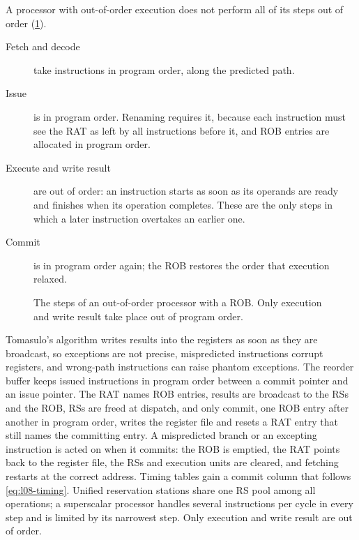 \documentclass[../main.tex]{subfiles}
\begin{document}
A processor with out-of-order execution does not
perform all of its steps out of order (\cref{fig:l08-order}).
\begin{description}
  \item[Fetch and decode] take instructions in program order, along the
    predicted path.
  \item[Issue] is in program order.  Renaming requires it, because each
    instruction must see the RAT as left by all instructions before it, and
    ROB entries are allocated in program order.
  \item[Execute and write result] are out of order: an instruction starts as
    soon as its operands are ready and finishes when its operation completes.
    These are the only steps in which a later instruction overtakes an
    earlier one.
  \item[Commit] is in program order again; the ROB restores the order that
    execution relaxed.
\end{description}

\begin{figure}[htbp]
  \centering
  
  \caption{The steps of an out-of-order processor with a ROB.  Only execution
    and write result take place out of program order.}
  \label{fig:l08-order}
\end{figure}

\begin{keypoint}
  Tomasulo's algorithm writes results into the registers as soon as they are
  broadcast, so exceptions are not precise, mispredicted instructions corrupt
  registers, and wrong-path instructions can raise phantom exceptions.  The
  reorder buffer keeps issued instructions in program order between a commit
  pointer and an issue pointer.  The RAT names ROB entries, results are
  broadcast to the RSs and the ROB, RSs are freed at dispatch, and only commit,
  one ROB entry after another in program order, writes the register file and
  resets a RAT entry that still names the committing entry.  A mispredicted
  branch or an excepting instruction is acted on when it commits: the ROB is
  emptied, the RAT points back to the register file, the RSs and execution
  units are cleared, and fetching restarts at the correct address.  Timing
  tables gain a commit column that follows \cref{eq:l08-timing}.  Unified
  reservation stations share one RS pool among all operations; a superscalar
  processor handles several instructions per cycle in every step and is limited
  by its narrowest step.  Only execution and write result are out of order.
\end{keypoint}
\end{document}
